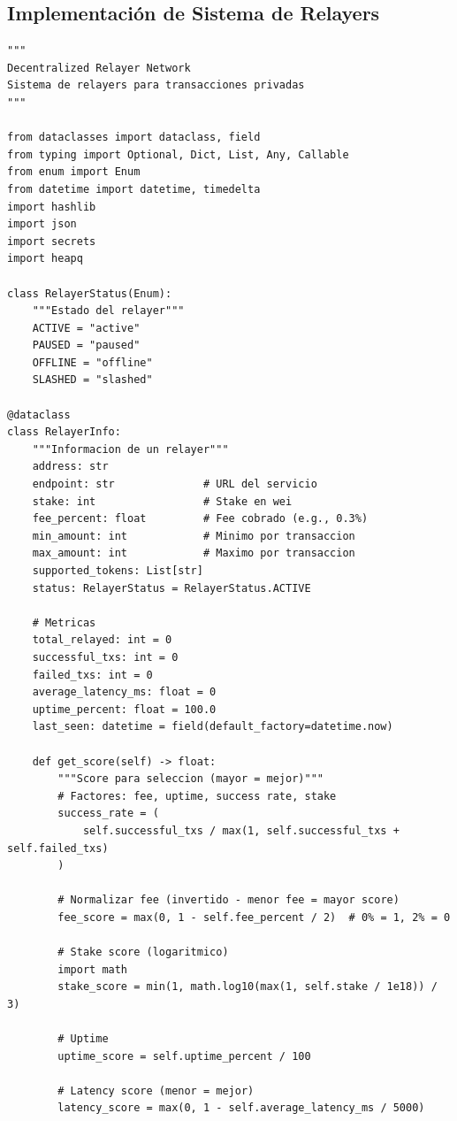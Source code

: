\documentclass[11pt,a4paper,twoside]{book}
\theoremstyle{definition}
\theoremstyle{remark}
\begin{document}
\subsection{Implementación de Sistema de Relayers}

\begin{lstlisting}[style=python, caption={Sistema de relayers descentralizado}]
"""
Decentralized Relayer Network
Sistema de relayers para transacciones privadas
"""

from dataclasses import dataclass, field
from typing import Optional, Dict, List, Any, Callable
from enum import Enum
from datetime import datetime, timedelta
import hashlib
import json
import secrets
import heapq

class RelayerStatus(Enum):
    """Estado del relayer"""
    ACTIVE = "active"
    PAUSED = "paused"
    OFFLINE = "offline"
    SLASHED = "slashed"

@dataclass
class RelayerInfo:
    """Informacion de un relayer"""
    address: str
    endpoint: str              # URL del servicio
    stake: int                 # Stake en wei
    fee_percent: float         # Fee cobrado (e.g., 0.3%)
    min_amount: int            # Minimo por transaccion
    max_amount: int            # Maximo por transaccion
    supported_tokens: List[str]
    status: RelayerStatus = RelayerStatus.ACTIVE
    
    # Metricas
    total_relayed: int = 0
    successful_txs: int = 0
    failed_txs: int = 0
    average_latency_ms: float = 0
    uptime_percent: float = 100.0
    last_seen: datetime = field(default_factory=datetime.now)
    
    def get_score(self) -> float:
        """Score para seleccion (mayor = mejor)"""
        # Factores: fee, uptime, success rate, stake
        success_rate = (
            self.successful_txs / max(1, self.successful_txs + self.failed_txs)
        )
        
        # Normalizar fee (invertido - menor fee = mayor score)
        fee_score = max(0, 1 - self.fee_percent / 2)  # 0% = 1, 2% = 0
        
        # Stake score (logaritmico)
        import math
        stake_score = min(1, math.log10(max(1, self.stake / 1e18)) / 3)
        
        # Uptime
        uptime_score = self.uptime_percent / 100
        
        # Latency score (menor = mejor)
        latency_score = max(0, 1 - self.average_latency_ms / 5000)
        

\end{lstlisting}
\end{document}
